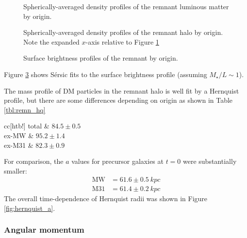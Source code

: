 \documentclass[twocolumn]{aastex63}
\newcommand{\todo}{\color{red}{TODO}\color{black}\hspace{2mm}}
\begin{document}
\begin{figure}[htb!]
	\caption{Spherically-averaged density profiles of the remnant luminous matter by origin.
		\label{fig:rem_lum_rho}}
\end{figure}

\begin{figure}[htb!]
	\caption{Spherically-averaged density profiles of the remnant halo by origin. Note the expanded $x$-axis relative to Figure \ref{fig:rem_lum_rho}
		\label{fig:rem_DM_rho}}
\end{figure}

\begin{figure}[htb!]
	\caption{Surface brightness profiles of the remnant by origin.
		\label{fig:rem_sersic_origin}}
\end{figure}

Figure \ref{fig:rem_sersic_origin} shows Sérsic fits to the surface brightness profile (assuming $M_\star/L \sim 1$). \todo{comment!}

The mass profile of DM particles in the remnant halo is well fit by a Hernquist profile, but there are some differences depending on origin as shown in Table \ref{tbl:remn_hq}

\begin{deluxetable}{cc}[htb!]
	\tablewidth{0pt}
	\startdata
	total &  $84.5 \pm 0.5$  \\
	ex-MW &   $95.2 \pm 1.4$  \\
	ex-M31 &   $82.3 \pm 0.9$
	\enddata
\end{deluxetable}

For comparison, the $a$ values for precursor galaxies at $t=0$ were substantially smaller:
\begin{align*}
	\text{MW} &= 61.6 \pm 0.5\ kpc\\
	\text{M31} &= 61.4 \pm 0.2\ kpc
\end{align*}
The overall time-dependence of Hernquist radii was shown in Figure \ref{fig:hernquist_a}.


\subsubsection{Angular momentum}
\end{document}
